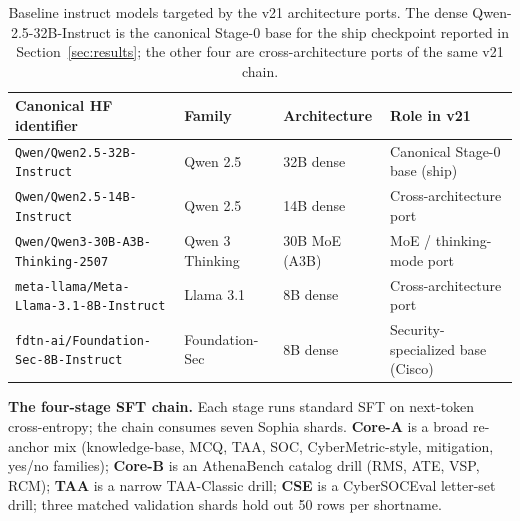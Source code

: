 \documentclass[conference]{IEEEtran}
\providecommand{\hfid}[1]{{\small\nolinkurl{#1}}}
\begin{document}
\begin{table}[t]
\centering
\caption{Baseline instruct models targeted by the v21 architecture ports. The dense Qwen-2.5-32B-Instruct is the canonical Stage-0 base for the ship checkpoint reported in Section~\ref{sec:results}; the other four are cross-architecture ports of the same v21 chain.}
\label{tab:base-models}
\small
\setlength{\tabcolsep}{4pt}
\begin{tabular}{p{4.8cm} l l l}
\hline
\textbf{Canonical HF identifier} & \textbf{Family} & \textbf{Architecture} & \textbf{Role in v21} \\
\hline
\hfid{Qwen/Qwen2.5-32B-Instruct}             & Qwen 2.5             & 32B dense          & Canonical Stage-0 base (ship) \\
\hfid{Qwen/Qwen2.5-14B-Instruct}             & Qwen 2.5             & 14B dense          & Cross-architecture port \\
\hfid{Qwen/Qwen3-30B-A3B-Thinking-2507}      & Qwen 3 Thinking      & 30B MoE (A3B)      & MoE / thinking-mode port \\
\hfid{meta-llama/Meta-Llama-3.1-8B-Instruct} & Llama 3.1            & 8B dense           & Cross-architecture port \\
\hfid{fdtn-ai/Foundation-Sec-8B-Instruct}    & Foundation-Sec       & 8B dense           & Security-specialized base (Cisco) \\
\hline
\end{tabular}
\end{table}

\textbf{The four-stage SFT chain.} Each stage runs standard SFT on next-token cross-entropy; the chain consumes seven Sophia shards. \textbf{Core-A} is a broad re-anchor mix (knowledge-base, MCQ, TAA, SOC, CyberMetric-style, mitigation, yes/no families); \textbf{Core-B} is an AthenaBench catalog drill (RMS, ATE, VSP, RCM); \textbf{TAA} is a narrow TAA-Classic drill; \textbf{CSE} is a CyberSOCEval letter-set drill; three matched validation shards hold out 50 rows per shortname.
\end{document}
